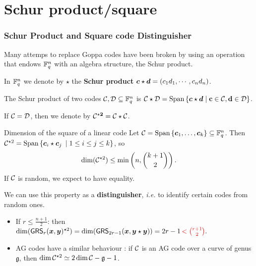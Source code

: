 \documentclass[
10pt, %
%
aspectratio=169, %
]{beamer}
\begin{document}
\section{Schur product/square}

\begin{frame}
	\frametitle{Schur Product and Square code Distinguisher}
	
	Many attemps to replace Goppa codes have been broken by using an operation that endows $\mathbb{F}_q^n$ with an algebra structure, the \alert{Schur product}.
	
	\medskip
		
	In $\mathbb{F}_q^n$ we denote by $\star$ the \textbf{Schur product} $\boldsymbol{c} \star \boldsymbol{d} = (c_1d_1,\cdots,c_nd_n)$.

\smallskip
	
	The Schur product of two codes $\mathcal{C}, \mathcal{D} \subseteq \mathbb{F}_q^n$ is $\mathbf{\mathcal{C} } \star \mathbf{\mathcal{D} }= \operatorname{Span}\left\{\boldsymbol{c} \star \boldsymbol{d} \mid \mathbf{c} \in \mathcal{C}, \mathbf{d} \in \mathcal{D}\right\}$.

	If $\mathcal{C} = \mathcal{D}$, then we denote by $\mathbf{\mathcal{C}^{\star2} = \mathcal{C} \star \mathcal{C}} $.
	\pause
	\begin{alertblock}{Dimension of the square of a linear code}
		Let $\mathcal{C}=\operatorname{Span}\left\{\boldsymbol{c}_1,\dots,\boldsymbol{c}_k\right\} \subseteq \mathbb{F}_q^n$. Then $\mathcal{C}^{\star 2}=\operatorname{Span}\left\{\boldsymbol{c}_i \star \boldsymbol{c}_j \: \mid 1 \leq i \leq j \leq k \right\}$, so 
		\[\displaystyle \dim (\mathcal{C}^{\star2}) \leq \mathrm{min}\left(n,\binom{k+1}{2}\right).\]
		If $\mathcal{C}$ is random, we expect to have equality. 
	\end{alertblock}
	
	\begin{mdframed}[style=mdf,backgroundcolor=red!10]
		We can use this property as a \textbf{distinguisher}, \textit{i.e.} to identify certain codes from random ones.
		
		\smallskip
		
		\begin{itemize}
			\item If $r \leq \frac{n+1}{2}$: then
			$\dim(\mathsf{GRS}_r(\boldsymbol{x},\boldsymbol{y})^{\star 2})=\dim(\mathsf{GRS}_{2r-1}(\boldsymbol{x},\boldsymbol{y} \star \boldsymbol{y}))= 2r-1 \textcolor{red}{\,<\binom{r+1}{2}}.$
			\item AG codes have a similar behaviour : if $\mathcal{C}$ is an AG code over a curve of genus $\mathfrak{g}$, then $\dim \mathcal{C}^{\star 2} \simeq 2 \dim \mathcal{C} - \mathfrak{g} -1$. 
		\end{itemize}
		
	\end{mdframed}
	
\end{frame}%
\end{document}
